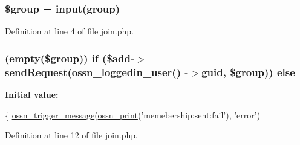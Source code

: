 \subsubsection[{\texorpdfstring{\$group}{$group}}]{\setlength{\rightskip}{0pt plus 5cm}\$group = {\bf input}(\textquotesingle{}group\textquotesingle{})}\hypertarget{join_8php_ad530a85733b0ec1dc321859fd8faa0dc}{}\label{join_8php_ad530a85733b0ec1dc321859fd8faa0dc}


Definition at line 4 of file join.\+php.

\subsubsection[{\texorpdfstring{else}{else}}]{ (empty(\$group)) {\bf if} (\${\bf add}-\/$>$send\+Request({\bf ossn\+\_\+loggedin\+\_\+user}() -\/$>$guid, \$group)) else}\hypertarget{join_8php_a65076ca057af28da8d90721a0aa29c4b}{}\label{join_8php_a65076ca057af28da8d90721a0aa29c4b}
{\bfseries Initial value\+:}
\begin{DoxyCode}
\{
    \hyperlink{ossn_8lib_8system_8php_ab3f23f23f32f50c12e7aea0ffaccaac7}{ossn\_trigger\_message}(\hyperlink{ossn_8lib_8languages_8php_a2be5d1c4b695593a9b9067b96df2150a}{ossn\_print}(\textcolor{stringliteral}{'memebership:sent:fail'}), \textcolor{stringliteral}{'error'})
\end{DoxyCode}


Definition at line 12 of file join.\+php.


